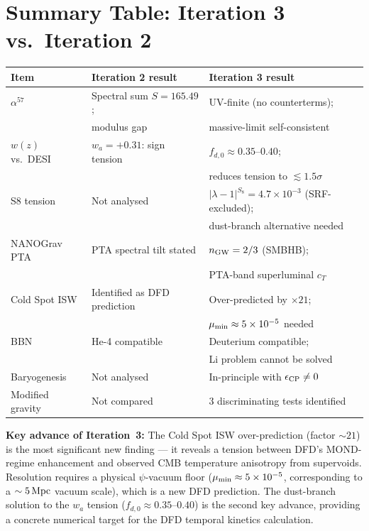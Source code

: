 \documentclass[11pt]{article}
\newcommand{\ee}[1]{\times 10^{#1}}
\newcommand{\lambdaone}{|\lambda-1|}
\newcommand{\mufd}{\mu}
\begin{document}
\section*{Summary Table: Iteration 3 vs.\ Iteration 2}

\begin{center}
\begin{tabular}{lll}
\toprule
Item & Iteration 2 result & Iteration 3 result \\
\midrule
$\alpha^{57}$ & Spectral sum $S=165.49$; & UV-finite (no counterterms); \\
 & modulus gap & massive-limit self-consistent \\
$w(z)$ vs.\ DESI & $w_a = +0.31$: sign tension & $f_{d,0} \approx 0.35$--$0.40$; \\
 & & reduces tension to $\lesssim 1.5\sigma$ \\
S8 tension & Not analysed & $\lambdaone^{S_8} = 4.7\ee{-3}$ (SRF-excluded); \\
 & & dust-branch alternative needed \\
NANOGrav PTA & PTA spectral tilt stated & $n_{\rm GW} = 2/3$ (SMBHB); \\
 & & PTA-band superluminal $c_T$ \\
Cold Spot ISW & Identified as DFD prediction & Over-predicted by $\times 21$; \\
 & & $\mufd_{\rm min} \approx 5\ee{-5}$ needed \\
BBN & He-4 compatible & Deuterium compatible; \\
 & & Li problem cannot be solved \\
Baryogenesis & Not analysed & In-principle with $\epsilon_{\rm CP} \neq 0$ \\
Modified gravity & Not compared & 3 discriminating tests identified \\
\bottomrule
\end{tabular}
\end{center}

\bigskip\noindent
\textbf{Key advance of Iteration~3:} The Cold Spot ISW over-prediction
(factor $\sim 21$) is the most significant new finding --- it reveals a
tension between DFD's MOND-regime enhancement and observed CMB
temperature anisotropy from supervoids.  Resolution requires a physical
$\psi$-vacuum floor ($\mufd_{\rm min} \approx 5\ee{-5}$, corresponding
to a $\sim 5\,{\rm Mpc}$ vacuum scale), which is a new DFD prediction.
The dust-branch solution to the $w_a$ tension ($f_{d,0} \approx 0.35$--$0.40$)
is the second key advance, providing a concrete numerical target for
the DFD temporal kinetics calculation.
\end{document}
